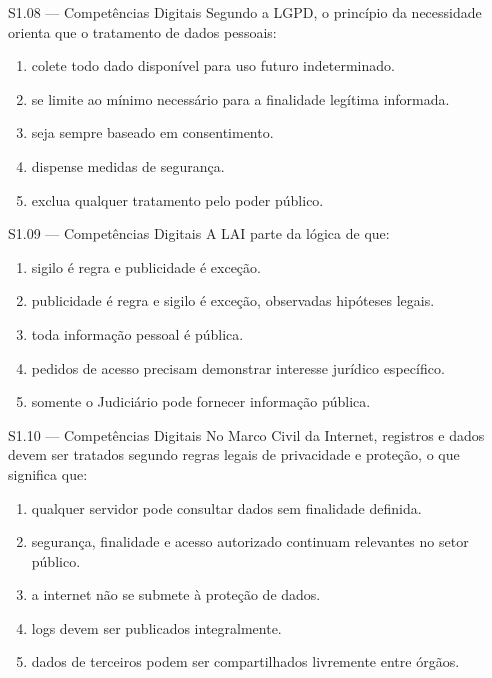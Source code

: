 \begin{questao}{S1.08 — Competências Digitais}
Segundo a LGPD, o princípio da necessidade orienta que o tratamento de dados pessoais:
\begin{enumerate}[label=\Alph*)]
\item colete todo dado disponível para uso futuro indeterminado.
\item se limite ao mínimo necessário para a finalidade legítima informada.
\item seja sempre baseado em consentimento.
\item dispense medidas de segurança.
\item exclua qualquer tratamento pelo poder público.
\end{enumerate}
\end{questao}

\begin{questao}{S1.09 — Competências Digitais}
A LAI parte da lógica de que:
\begin{enumerate}[label=\Alph*)]
\item sigilo é regra e publicidade é exceção.
\item publicidade é regra e sigilo é exceção, observadas hipóteses legais.
\item toda informação pessoal é pública.
\item pedidos de acesso precisam demonstrar interesse jurídico específico.
\item somente o Judiciário pode fornecer informação pública.
\end{enumerate}
\end{questao}

\begin{questao}{S1.10 — Competências Digitais}
No Marco Civil da Internet, registros e dados devem ser tratados segundo regras legais de privacidade e proteção, o que significa que:
\begin{enumerate}[label=\Alph*)]
\item qualquer servidor pode consultar dados sem finalidade definida.
\item segurança, finalidade e acesso autorizado continuam relevantes no setor público.
\item a internet não se submete à proteção de dados.
\item logs devem ser publicados integralmente.
\item dados de terceiros podem ser compartilhados livremente entre órgãos.
\end{enumerate}
\end{questao}

